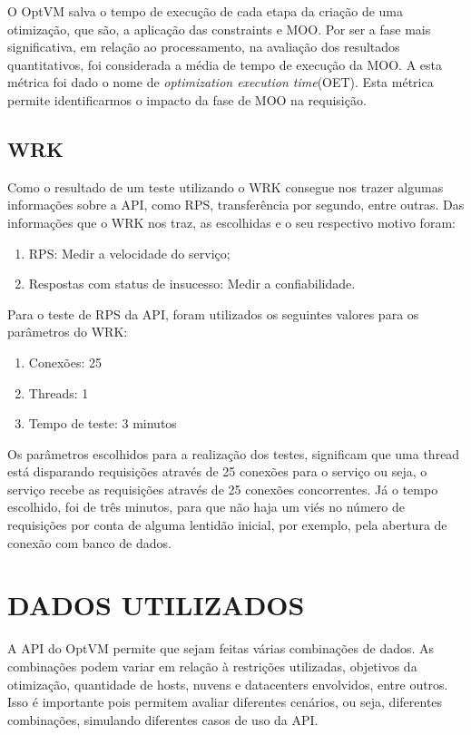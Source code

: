 O OptVM salva o tempo de execução de cada etapa da criação de uma otimização, que são, 
a aplicação das constraints e MOO. Por ser a fase mais significativa, em relação ao processamento,
na avaliação dos resultados quantitativos, foi considerada a média de tempo
de execução da MOO. A esta métrica foi dado o nome de \textit{optimization execution time}(OET).
Esta métrica permite identificarmos o impacto da fase de MOO na requisição.



\subsection{WRK}

Como o resultado de um teste utilizando o WRK consegue nos trazer algumas informações 
sobre a API, como RPS, transferência por segundo, entre outras. Das informações que
o WRK nos traz, as escolhidas e o seu respectivo motivo foram:

\begin{enumerate}
  \item RPS: Medir a velocidade do serviço;
  \item Respostas com status de insucesso: Medir a confiabilidade. 
\end{enumerate}

Para o teste de RPS da API, foram utilizados os seguintes valores para os parâmetros do WRK:

\begin{enumerate}
  \item Conexões: 25
  \item Threads: 1
  \item Tempo de teste: 3 minutos
\end{enumerate}

Os parâmetros escolhidos para a realização dos testes, significam que uma thread está disparando requisições através 
de 25 conexões para o serviço ou seja, o serviço recebe as requisições através de 25 conexões
concorrentes. Já o tempo escolhido, foi de três minutos, para que não haja um viés no número
de requisições por conta de alguma lentidão inicial, por exemplo, pela abertura de conexão com 
banco de dados.

\section{DADOS UTILIZADOS}
A API do OptVM permite que sejam feitas várias combinações de dados. As combinações
podem variar em relação à restrições utilizadas, objetivos da otimização, quantidade
de hosts, nuvens e datacenters envolvidos, entre outros. Isso é importante pois 
permitem avaliar diferentes cenários, ou seja, diferentes combinações, simulando diferentes
casos de uso da API.


